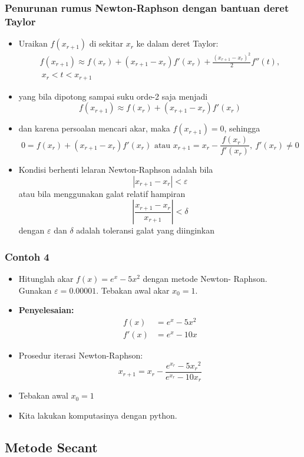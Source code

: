 \documentclass[pdflatex,compress]{beamer}
\begin{document}
\begin{frame}
	\frametitle{Penurunan rumus Newton-Raphson dengan bantuan deret Taylor}
	\begin{itemize}
		\item Uraikan $ f(x_{r+1}) $ di sekitar $ x_r $ ke dalam deret Taylor:
		\begin{align*}
			f(x_{r+1}) \approx f(x_r) + (x_{r+1} - x_r)f'(x_r) + \frac{(x_{r+1} - x_r)^2}{2}f''(t),\\
			~x_r<t<x_{r+1}
		\end{align*}
		\item yang bila dipotong sampai suku orde-2 saja menjadi
		\[ f(x_{r+1}) \approx f(x_r) + (x_{r+1} - x_r)f'(x_r) \]
		\item dan karena persoalan mencari akar, maka $ f(x_{r+1} ) = 0 $, sehingga \[ 0 = f(x_r) + (x_{r+1} - x_r)f'(x_r) \text{ atau } x_{r+1} = x_r - \frac{f(x_r)}{f'(x_r)},~f'(x_r) \neq 0\]
	\end{itemize}
\end{frame}

\begin{frame}
	\begin{itemize}
		\item Kondisi berhenti lelaran Newton-Raphson adalah bila
		\[ | x_{r+1} - x_r | < \varepsilon \]
		atau bila menggunakan galat relatif hampiran
		\[ | \frac{x_{r+1} - x_r}{x_{r+1}} | < \delta \]
		dengan $\varepsilon$ dan $\delta$ adalah toleransi galat yang diinginkan
	\end{itemize}
\end{frame}

\begin{frame}
	\frametitle{Contoh 4}
	\begin{itemize}
		\item Hitunglah akar $ f(x) = e^x - 5x^2 $ dengan metode Newton-
		Raphson. Gunakan $\varepsilon = 0.00001$. Tebakan awal akar $ x_0 = 1 $.
		\item[] \textbf{Penyelesaian:}
		\begin{align*}
			f(x) &= e^x - 5x^2\\
			f'(x) &= e^x - 10x
		\end{align*}
		\item[] Prosedur iterasi Newton-Raphson:
		\[ x_{r+1} = x_r - \frac{e^{x_r} - 5{x_r}^2}{e^{x_r} - 10{x_r}} \]
		\item[] Tebakan awal $ x_0 = 1 $
		\item[] Kita lakukan komputasinya dengan python.
	\end{itemize}
\end{frame}

\subsection{Metode Secant}
\end{document}
